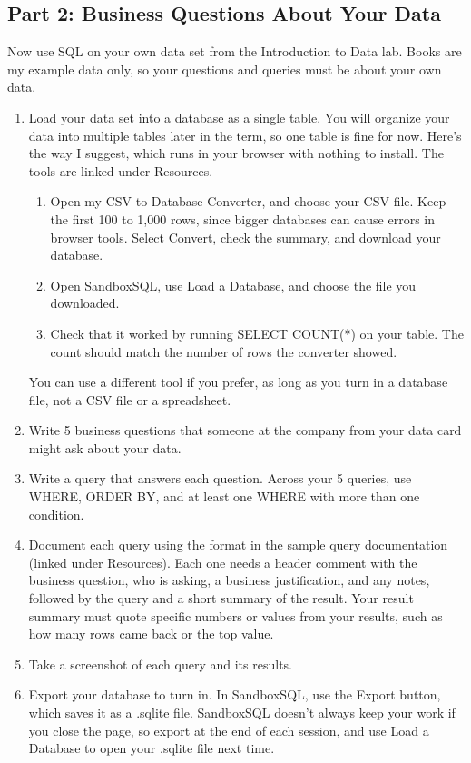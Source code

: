 \documentclass[12pt]{article}
\begin{document}
\subsection*{Part 2: Business Questions About Your Data}
Now use SQL on your own data set from the Introduction to Data lab. Books are my example data only, so your questions and queries must be about your own data.
\begin{enumerate}
    \item Load your data set into a database as a single table. You will organize your data into multiple tables later in the term, so one table is fine for now. Here's the way I suggest, which runs in your browser with nothing to install. The tools are linked under Resources.
    \begin{enumerate}
        \item Open my CSV to Database Converter, and choose your CSV file. Keep the first 100 to 1,000 rows, since bigger databases can cause errors in browser tools. Select Convert, check the summary, and download your database.
        \item Open SandboxSQL, use Load a Database, and choose the file you downloaded.
        \item Check that it worked by running SELECT COUNT(*) on your table. The count should match the number of rows the converter showed.
    \end{enumerate}
    You can use a different tool if you prefer, as long as you turn in a database file, not a CSV file or a spreadsheet.
    \item Write 5 business questions that someone at the company from your data card might ask about your data.
    \item Write a query that answers each question. Across your 5 queries, use WHERE, ORDER BY, and at least one WHERE with more than one condition.
    \item Document each query using the format in the sample query documentation (linked under Resources). Each one needs a header comment with the business question, who is asking, a business justification, and any notes, followed by the query and a short summary of the result. Your result summary must quote specific numbers or values from your results, such as how many rows came back or the top value.
    \item Take a screenshot of each query and its results.
    \item Export your database to turn in. In SandboxSQL, use the Export button, which saves it as a .sqlite file. SandboxSQL doesn't always keep your work if you close the page, so export at the end of each session, and use Load a Database to open your .sqlite file next time.
\end{enumerate}
\end{document}

